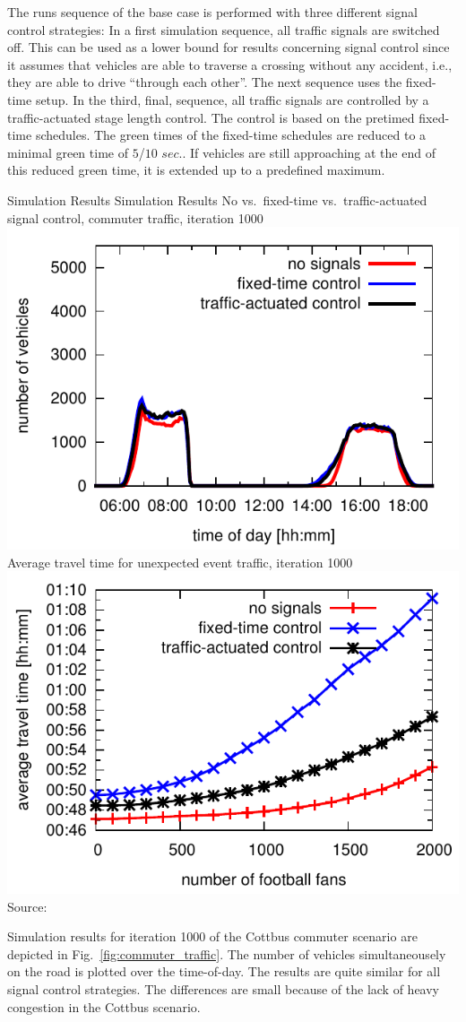 %
The runs sequence of the base case is performed with three different signal control strategies:
%
In a first simulation sequence, all traffic signals are switched off. This can be used as a lower bound for results concerning signal control since it assumes that vehicles are able to traverse a crossing without any accident, i.e., they are able to drive ``through each other''. 
%
The next sequence uses the fixed-time setup. 
%
In the third, final, sequence, all traffic signals are controlled by a traffic-actuated stage length control. 
The control is based on the pretimed fixed-time schedules. 
The green times of the fixed-time schedules are reduced to a minimal green time of $5$/$10$ $sec.$. 
If vehicles are still approaching at the end of this reduced green time, it is extended up to a predefined maximum. 

\createfigure%
{Simulation Results}%
{Simulation Results}%
{\label{fig:results_histogram}}
{%
  \createsubfigure%
  {No vs.~fixed-time vs.~traffic-actuated signal control, commuter traffic, iteration 1000}%
	{\includegraphics[width=0.48\linewidth]{extending/figures/signalslanes/leg_histogram_1292_1293_1291_it_1000.pdf}}
  {\label{fig:commuter_traffic}}%
  \createsubfigure%
	{Average travel time for unexpected event traffic, iteration 1000}
	{\includegraphics[width=0.48\linewidth]{extending/figures/signalslanes/average_travel_time_1220_1222.pdf}}
	{\label{fig:unexpected_event}}
}%
{Source:~\citet{Grether2014PhD}}

Simulation results for iteration 1000 of the Cottbus commuter scenario are depicted in
Fig.~\ref{fig:commuter_traffic}. 
The number of vehicles simultaneousely on the road is plotted over the time-of-day. 
The results are quite similar for all signal control strategies. 
The differences are small because of the lack of heavy congestion in the Cottbus scenario. 

